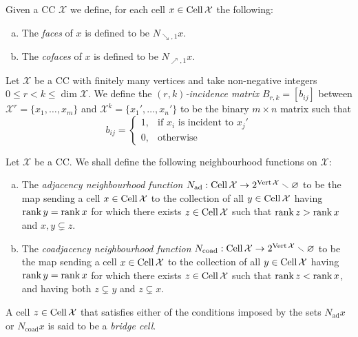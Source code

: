 \begin{definition}
    \label{def:cc-cell-face-and-coface}
    Given a CC \(\mathcal{X}\) we define, for each cell \(x \in \operatorname{Cell} \mathcal{X}\) the following:
    \begin{enumerate}[(a)]\setlength\itemsep{0em}
        \item The \emph{faces} of \(x\) is defined to be \(N_{\searrow, 1} x\).

        \item The \emph{cofaces} of \(x\) is defined to be \(N_{\nearrow, 1} x\).
    \end{enumerate}
\end{definition}

\begin{definition}
    \label{def:cc-incidence-matrix}
    Let \(\mathcal{X}\) be a CC with finitely many vertices and take non-negative integers
    \(0 \leq r < k \leq \dim \mathcal{X}\). We define the \emph{\((r, k)\)-incidence matrix
    \(B_{r, k} = [b_{i j}]\)} between \(\mathcal{X}^r = \{x_1, \dots, x_m\}\) and
    \(\mathcal{X}^k = \{x_1', \dots, x_n'\}\) to be the binary \(m \times n\) matrix such that
    \[
        b_{i j} =
        \begin{cases}
            1, & \text{if } x_i \text{ is incident to } x_j' \\
            0, & \text{otherwise}
        \end{cases}
    \]
\end{definition}

\begin{definition}
    \label{def:co-adjacency-neighbourhood-function}
    Let \(\mathcal{X}\) be a CC. We shall define the following neighbourhood functions on \(\mathcal{X}\):
    \begin{enumerate}[(a)]\setlength\itemsep{0em}
        \item The \emph{adjacency neighbourhood function}
              \(N_{\text{ad}}: \operatorname{Cell} \mathcal{X} \to 2^{\operatorname{Vert} \mathcal X} \smallsetminus \varnothing\) to be the map sending
              a cell \(x \in \operatorname{Cell} \mathcal{X}\) to the collection of all
              \(y \in \operatorname{Cell} \mathcal{X}\) having \(\operatorname{rank} y = \operatorname{rank} x\) for which there exists
              \(z \in \operatorname{Cell} \mathcal{X}\) such that \(\operatorname{rank} z > \operatorname{rank} x\) and \(x, y \subsetneq z\).

        \item The \emph{coadjacency neighbourhood function}
              \(N_{\text{coad}}: \operatorname{Cell} \mathcal{X} \to 2^{\operatorname{Vert} \mathcal X} \smallsetminus \varnothing\) to be the map sending
              a cell \(x \in \operatorname{Cell} \mathcal{X}\) to the collection of all
              \(y \in \operatorname{Cell} \mathcal{X}\) having \(\operatorname{rank} y = \operatorname{rank} x\) for which there exists
              \(z \in \operatorname{Cell} \mathcal{X}\) such that \(\operatorname{rank} z < \operatorname{rank} x\), and having both \(z \subsetneq y\) and
              \(z \subsetneq x\).
    \end{enumerate}
    A cell \(z \in \operatorname{Cell} \mathcal{X}\) that satisfies either of the conditions imposed by the
    sets \(N_{\text{ad}} x\) or \(N_{\text{coad}} x\) is said to be a \emph{bridge cell}.
\end{definition}



